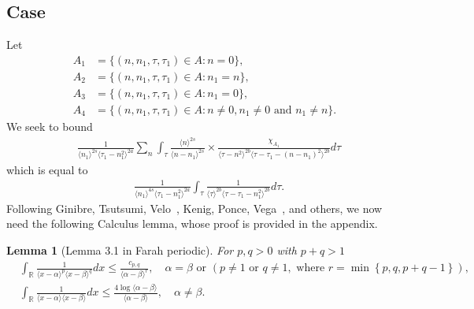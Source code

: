 \documentclass[12pt,reqno]{amsart}
\numberwithin{equation}{section}  %
\renewcommand{\cref}{\Cref}
\newcommand{\rr}{\mathbb{R}}
\newtheorem{lemma}[theorem]{Lemma}
\begin{document}
 \subsection{Case \cref{it-6}} 
\label{ssec:case-it-6}
Let 
%
%
\begin{align*}
A_1&=\{(n, n_1, \tau, \tau_1)\in A: n=0\},\\
A_2&=\{(n, n_1, \tau, \tau_1)\in A: n_1 = n \},\\
A_3&=\{(n, n_1, \tau, \tau_1)\in A: n_1=0 \},\\
A_4&=\{(n, n_1, \tau, \tau_1)\in A: n \neq 0, n_1 \neq 0 \text{ and } n_1 \neq n \}.
\end{align*} 
%
%
%
We seek to bound
\begin{equation*}
\begin{split}
  & \frac{1}{\langle n_{1} \rangle ^{2s}
  \langle \tau_{1} - n_{1}^{2} \rangle
  ^{2a}} \sum_{n } \int_{\tau} \frac{\langle n \rangle ^{2s}}{\langle
  n - n_{1}\rangle ^{2s}}  \times \frac{\chi_{A_{1}}}{\langle
  \tau - n^{2}  \rangle^{2b}  \langle \tau - \tau_{1} - (n - n_{1})^{2}
  \rangle^{2b} } d \tau 
\end{split}
\end{equation*}
which is equal to 
%
\begin{equation}
  \label{case-1-term-1-reduc}
\begin{split}
  & \frac{1}{\langle n_{1} \rangle ^{4s}
  \langle \tau_{1} - n_{1}^{2} \rangle
  ^{2a}} \int_{\tau} \frac{1}{\langle
  \tau  \rangle^{2b}  \langle \tau - \tau_{1} - n_{1}^{2}
  \rangle^{2b} } d \tau.
\end{split}
\end{equation}
%
Following Ginibre, Tsutsumi, Velo~\cite{Ginibre:1997fk}, Kenig, Ponce, Vega~\cite{Kenig:1996aa}, and others,
we now need the following Calculus lemma, whose proof is provided in the
appendix.
%
%
%
%
%
%
%
\begin{lemma}[Lemma 3.1 in Farah periodic]
	\label{lem:calc}
 For $p, q > 0$ with $p +q >1$
 \begin{equation*}
\begin{split}
  & \int_{\rr} \frac{1}{\langle x - \alpha \rangle ^{p} \langle x -
  \beta \rangle
  ^{q}} d x
  \le \frac{c_{p,q}}{\langle \alpha - \beta \rangle ^{r}}, \quad \alpha=\beta
  \text{ or } (p \neq 1 \text{ or } q \neq 1, \text{ where } r =
  \min\left\{ p, q, p+q-1 \right\}), 
  \\
  &\int_{\rr} \frac{1}{\langle x - \alpha \rangle  \langle x - \beta
  \rangle } d x
  \le  \frac{4 \log \langle \alpha - \beta \rangle }{\langle \alpha - \beta
  \rangle }, \quad \alpha \neq \beta.
\end{split}
\end{equation*}
\end{lemma}
\end{document}
